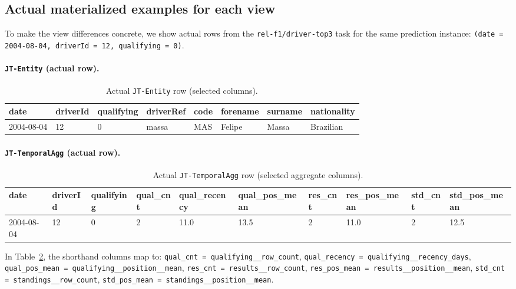 \documentclass[11pt]{article}
\newcommand{\viewname}[1]{\texttt{#1}}
\begin{document}
\subsection{Actual materialized examples for each view}
\label{sec:actual_view_examples}

To make the view differences concrete, we show actual rows from the
\texttt{rel-f1/driver-top3} task for the same prediction instance:
\texttt{(date = 2004-08-04, driverId = 12, qualifying = 0)}.

\paragraph{\viewname{JT-Entity} (actual row).}
\begin{table}[h]
\centering
\small
\caption{Actual \viewname{JT-Entity} row (selected columns).}
\label{tab:jt_entity_actual_example}
\begin{tabular}{llllllll}
\toprule
date & driverId & qualifying & driverRef & code & forename & surname & nationality \\
\midrule
2004-08-04 & 12 & 0 & massa & MAS & Felipe & Massa & Brazilian \\
\bottomrule
\end{tabular}
\end{table}

\paragraph{\viewname{JT-TemporalAgg} (actual row).}
\begin{table}[h]
\centering
\small
\caption{Actual \viewname{JT-TemporalAgg} row (selected aggregate columns).}
\label{tab:jt_temporalagg_actual_example}
\begin{tabular}{llllllllll}
\toprule
date & driverId & qualifying & qual\_cnt & qual\_recency & qual\_pos\_mean & res\_cnt & res\_pos\_mean & std\_cnt & std\_pos\_mean \\
\midrule
2004-08-04 & 12 & 0 & 2 & 11.0 & 13.5 & 2 & 11.0 & 2 & 12.5 \\
\bottomrule
\end{tabular}
\end{table}

In Table~\ref{tab:jt_temporalagg_actual_example}, the shorthand columns map to:
\texttt{qual\_cnt = qualifying\_\_row\_count},
\texttt{qual\_recency = qualifying\_\_recency\_days},
\texttt{qual\_pos\_mean = qualifying\_\_position\_\_mean},
\texttt{res\_cnt = results\_\_row\_count},
\texttt{res\_pos\_mean = results\_\_position\_\_mean},
\texttt{std\_cnt = standings\_\_row\_count},
\texttt{std\_pos\_mean = standings\_\_position\_\_mean}.
\end{document}
